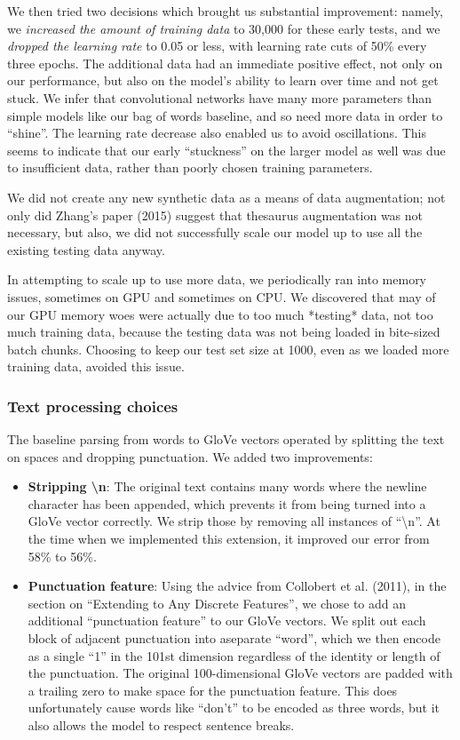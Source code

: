 \documentclass{article}
\newenvironment{itemizedense}{
\begin{itemize}
  \setlength{\itemsep}{1pt}
  \setlength{\parskip}{0pt}
  \setlength{\parsep}{0pt}
}{\end{itemize}}
\begin{document}
We then tried two decisions which brought us substantial improvement: namely, we \emph{increased the amount of training data} to 30,000 for these early tests, and we \emph{dropped the learning rate} to 0.05 or less, with learning rate cuts of 50\% every three epochs. The additional data had an immediate positive effect, not only on our performance, but also on the model's ability to learn over time and not get stuck. We infer that convolutional networks have many more parameters than simple models like our bag of words baseline, and so need more data in order to ``shine''. The learning rate decrease also enabled us to avoid oscillations. This seems to indicate that our early ``stuckness'' on the larger model as well was due to insufficient data, rather than poorly chosen training parameters.

We did not create any new synthetic data as a means of data augmentation; not only did Zhang's paper (2015) suggest that thesaurus augmentation was not necessary, but also, we did not successfully scale our model up to use all the existing testing data anyway.

In attempting to scale up to use more data, we periodically ran into memory issues, sometimes on GPU and sometimes on CPU. We discovered that may of our GPU memory woes were actually due to too much *testing* data, not too much training data, because the testing data was not being loaded in bite-sized batch chunks. Choosing to keep our test set size at 1000, even as we loaded more training data, avoided this issue.

\subsubsection{Text processing choices}
The baseline parsing from words to GloVe vectors operated by splitting the text on spaces and dropping punctuation. We added two improvements:

\begin{itemizedense}
\item \textbf{Stripping \textbackslash n}: The original text contains many words where the newline character has been appended, which prevents it from being turned into a GloVe vector correctly. We strip those by removing all instances of ``\textbackslash n''. At the time when we implemented this extension, it improved our error from 58\% to 56\%.

\item \textbf{Punctuation feature}: Using the advice from Collobert et al. (2011), in the section on ``Extending to Any Discrete Features'', we chose to add an additional ``punctuation feature'' to our GloVe vectors. We split out each block of adjacent punctuation into aseparate ``word'', which we then encode as a single ``1'' in the 101st dimension regardless of the identity or length of the punctuation. The original 100-dimensional GloVe vectors are padded with a trailing zero to make space for the punctuation feature. This does unfortunately cause words like ``don't'' to be encoded as three words, but it also allows the model to respect sentence breaks. 
\end{itemizedense}
\end{document}
